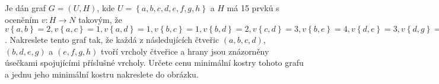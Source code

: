 Je dán graf $G=(U,H)$, kde $U=\left \{a,b,c,d,e,f,g,h  \right \}$ a $H$ má 15
prvků s oceněním $v:H\rightarrow N$ takovým, že $v\left \{ a,b \right \}=2,
v\left \{ a,c \right \}=1, v\left \{ a,d \right \}=1, v\left \{ b,c \right \}=1,
v\left \{ b,d \right \}=2, v\left \{ c,d \right \}=3, v\left \{ b,e \right \}=4,
v\left \{ d,e \right \}=3, v\left \{ d,g \right \}=2, v\left \{ e,f \right \}=4,
v\left \{ e,g \right \}=3, v\left \{ e,h \right \}=2, v\left \{ f,g \right \}=3,
v\left \{ f,h \right \}=1, v\left \{ g,h \right \}=1$. Nakreslete tento graf
tak, že každá z následujících čtveřic $(a,b,c,d)$, $(b,d,e,g)$ a $(e,f,g,h)$ tvoří
vrcholy čtveřice a hrany  jsou znázorněny úsečkami spojujícími příslušné
vrcholy. Určete cenu minimální kostry tohoto grafu a jednu jeho minimální kostru
nakreslete do obrázku.
